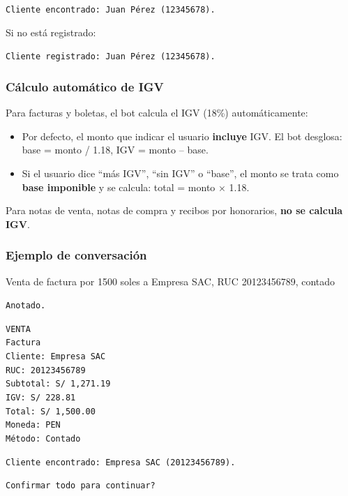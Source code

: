 \documentclass[12pt,a4paper]{article}
\begin{document}
\begin{mensajebot}
\texttt{Cliente encontrado: Juan P\'erez (12345678).}
\end{mensajebot}

Si no est\'a registrado:

\begin{mensajebot}
\texttt{Cliente registrado: Juan P\'erez (12345678).}
\end{mensajebot}

\subsubsection{C\'alculo autom\'atico de IGV}

Para facturas y boletas, el bot calcula el IGV (18\%) autom\'aticamente:

\begin{itemize}
    \item Por defecto, el monto que indicar el usuario \textbf{incluye} IGV. El bot desglosa: base = monto / 1.18, IGV = monto -- base.
    \item Si el usuario dice ``m\'as IGV'', ``sin IGV'' o ``base'', el monto se trata como \textbf{base imponible} y se calcula: total = monto $\times$ 1.18.
\end{itemize}

Para notas de venta, notas de compra y recibos por honorarios, \textbf{no se calcula IGV}.

\subsubsection{Ejemplo de conversaci\'on}

\begin{mensajeusuario}
Venta de factura por 1500 soles a Empresa SAC, RUC 20123456789, contado
\end{mensajeusuario}

\begin{mensajebot}
\texttt{Anotado.}

\medskip
\texttt{VENTA} \\
\texttt{Factura} \\
\texttt{Cliente: Empresa SAC} \\
\texttt{RUC: 20123456789} \\
\texttt{Subtotal: S/ 1,271.19} \\
\texttt{IGV: S/ 228.81} \\
\texttt{Total: S/ 1,500.00} \\
\texttt{Moneda: PEN} \\
\texttt{M\'etodo: Contado}

\medskip
\texttt{Cliente encontrado: Empresa SAC (20123456789).}

\medskip
\texttt{Confirmar todo para continuar?}
\end{mensajebot}
\end{document}
